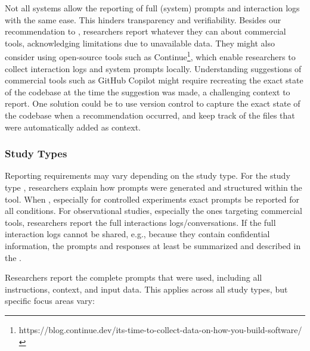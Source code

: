 Not all systems allow the reporting of full (system) prompts and interaction logs with the same ease.
This hinders transparency and verifiability.
Besides our recommendation to \openllm, researchers \should report whatever they can about commercial tools, acknowledging limitations due to unavailable data.
They might also consider using open-source tools such as Continue\footnote{https://blog.continue.dev/its-time-to-collect-data-on-how-you-build-software/}, which enable researchers to collect interaction logs and system prompts locally.
Understanding suggestions of commercial tools such as GitHub Copilot might require recreating the exact state of the codebase at the time the suggestion was made, a challenging context to report.
One solution could be to use version control to capture the exact state of the codebase when a recommendation occurred, and keep track of the files that were automatically added as context.


\subsubsection{Study Types}

Reporting requirements may vary depending on the study type.
For the study type \newtools, researchers \must explain how prompts were generated and structured within the tool.
When \llmusage, especially for controlled experiments exact prompts \must be reported for all conditions.
For observational studies, especially the ones targeting commercial tools, researchers \must report the full interactions logs/conversations.
If the full interaction logs cannot be shared, e.g., because they contain confidential information, the prompts and responses \should at least be summarized and described in the \paper.

Researchers \must report the complete prompts that were used, including all instructions, context, and input data. This applies across all study types, but specific focus areas vary:

